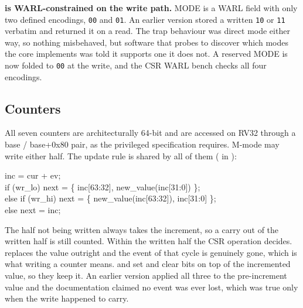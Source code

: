 \begin{deviation}
\textbf{ is WARL-constrained on the write path.} MODE is a WARL
field with only two defined encodings, \texttt{00} and \texttt{01}. An earlier
version stored a written \texttt{10} or \texttt{11} verbatim and returned it on a
read. The trap behaviour was direct mode either way, so nothing misbehaved, but
software that probes  to discover which modes the core implements was
told it supports one it does not. A reserved MODE is now folded to \texttt{00} at
the write, and the CSR WARL bench checks all four encodings.
\end{deviation}

\subsection{Counters}

All seven counters are architecturally 64-bit and are accessed on RV32 through a
base / base+0x80 pair, as the privileged specification requires. M-mode may write
either half. The update rule is shared by all of them
( in ):

\begin{center}
\begin{minipage}{0.80\linewidth}
\ttfamily\small
inc = cur + ev;\\
if (wr\_lo)      next = \{ inc[63:32], new\_value(inc[31:0])  \};\\
else if (wr\_hi) next = \{ new\_value(inc[63:32]), inc[31:0] \};\\
else             next = inc;
\end{minipage}
\end{center}

The half not being written always takes the increment, so a carry out of the
written half is still counted. Within the written half the CSR operation
decides.  replaces the value outright and the event of that cycle is
genuinely gone, which is what writing a counter means.  and
 set and clear bits on top of the incremented value, so they keep it.
An earlier version applied all three to the pre-increment value and the
documentation claimed no event was ever lost, which was true only when the write
happened to carry.

